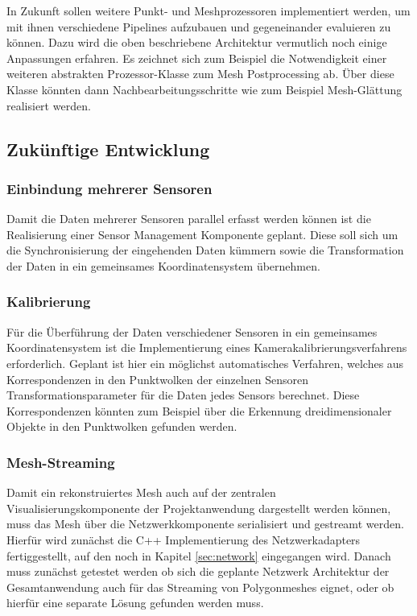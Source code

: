 In Zukunft sollen weitere Punkt- und Meshprozessoren implementiert werden, um mit ihnen verschiedene Pipelines aufzubauen und gegeneinander evaluieren zu können. Dazu wird die oben beschriebene Architektur vermutlich noch einige Anpassungen erfahren. Es zeichnet sich zum Beispiel die Notwendigkeit einer weiteren abstrakten Prozessor-Klasse zum Mesh Postprocessing ab. Über diese Klasse könnten dann Nachbearbeitungsschritte wie zum Beispiel Mesh-Glättung realisiert werden.

\subsection{Zukünftige Entwicklung}
\subsubsection{Einbindung mehrerer Sensoren}
Damit die Daten mehrerer Sensoren parallel erfasst werden können ist die Realisierung einer Sensor Management Komponente geplant. Diese soll sich um die Synchronisierung der eingehenden Daten kümmern sowie die Transformation der Daten in ein gemeinsames Koordinatensystem übernehmen.

\subsubsection{Kalibrierung}
Für die Überführung der Daten verschiedener Sensoren in ein gemeinsames Koordinatensystem ist die Implementierung eines Kamerakalibrierungsverfahrens erforderlich. Geplant ist hier ein möglichst automatisches Verfahren, welches aus Korrespondenzen in den Punktwolken der einzelnen Sensoren Transformationsparameter für die Daten jedes Sensors berechnet. Diese Korrespondenzen könnten zum Beispiel über die Erkennung dreidimensionaler Objekte in den Punktwolken gefunden werden.

\subsubsection{Mesh-Streaming}
Damit ein rekonstruiertes Mesh auch auf der zentralen Visualisierungskomponente der Projektanwendung dargestellt werden können, muss das Mesh über die Netzwerkkomponente serialisiert und gestreamt werden. Hierfür wird zunächst die C++ Implementierung des Netzwerkadapters fertiggestellt, auf den noch in Kapitel \ref{sec:network} eingegangen wird. Danach muss zunächst getestet werden ob sich die geplante Netzwerk Architektur der Gesamtanwendung auch für das Streaming von Polygonmeshes eignet, oder ob hierfür eine separate Lösung gefunden werden muss.

